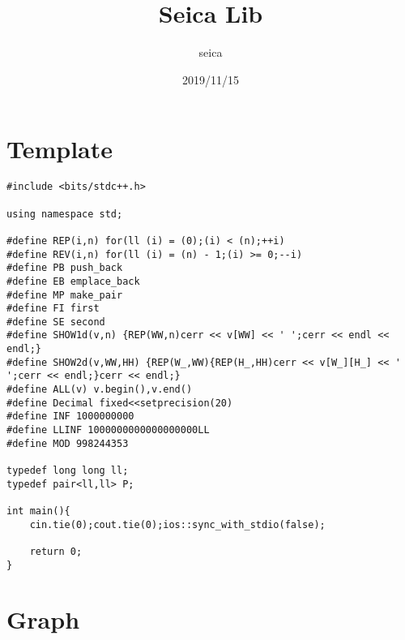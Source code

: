 \documentclass[10pt]{article}
\title{Seica Lib}
\author{seica}
\date{2019/11/15}
\begin{document}
\maketitle

\tableofcontents
\clearpage

\section{Template}
\begin{lstlisting}
#include <bits/stdc++.h>

using namespace std;

#define REP(i,n) for(ll (i) = (0);(i) < (n);++i)
#define REV(i,n) for(ll (i) = (n) - 1;(i) >= 0;--i)
#define PB push_back
#define EB emplace_back
#define MP make_pair
#define FI first
#define SE second
#define SHOW1d(v,n) {REP(WW,n)cerr << v[WW] << ' ';cerr << endl << endl;}
#define SHOW2d(v,WW,HH) {REP(W_,WW){REP(H_,HH)cerr << v[W_][H_] << ' ';cerr << endl;}cerr << endl;}
#define ALL(v) v.begin(),v.end()
#define Decimal fixed<<setprecision(20)
#define INF 1000000000
#define LLINF 1000000000000000000LL
#define MOD 998244353

typedef long long ll;
typedef pair<ll,ll> P;

int main(){
	cin.tie(0);cout.tie(0);ios::sync_with_stdio(false);

	return 0;
}
\end{lstlisting}


\section{Graph}
\end{document}
